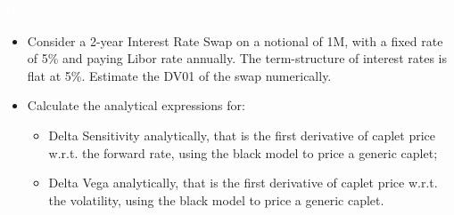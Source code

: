 \documentclass{beamer}
\begin{document}
\begin{homework}
	\begin{frame}{\textcolor{white}{Homework}}
		\begin{itemize}
			\item[white] Consider a 2-year Interest Rate Swap on a notional of 1M, with a fixed rate of 5\% and paying Libor rate annually. The term-structure of interest rates is flat at 5\%.
			Estimate the DV01 of the swap numerically.
			\item[white] Calculate the analytical expressions for:
			\begin{itemize}
				\item[white] Delta Sensitivity analytically, that is the first derivative of caplet price w.r.t. the forward rate, using the black model to price a generic caplet;
				\item[white] Delta Vega analytically, that is the first derivative of caplet price w.r.t. the volatility, using the black model to price a generic caplet.
			\end{itemize}
		\end{itemize}
	\end{frame}
\end{homework}

%
\end{document}
